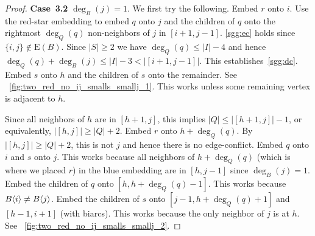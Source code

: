 \documentclass[11pt,a4paper,colorlinks=true,urlcolor=blue,citecolor=red]{article}
\theoremstyle{plain}
\newcommand{\case}[1]{\par\vspace{.5\baselineskip}\noindent\textbf{\sffamily Case~#1}}
\newcommand{\EB}{\mathrm{E}(B)}
\begin{document}
\begin{proof}
  \case{3.2} $\deg_B(j)=1$. We first try the following. Embed $r$ onto
  $i$. Use the red-star embedding to embed $q$ onto $j$ and the
  children of $q$ onto the rightmost $\deg_Q(q)$ non-neighbors of $j$ in
  $[i+1,j-1]$. \ref{sgg:ec} holds since $\{i,j\}\not\in\EB$. Since
  $|S|\geq 2$ we have $\deg_Q(q)\leq|I|-4$ and hence
  $\deg_Q(q)+\deg_B(j)\leq |I|-3<|[i+1,j-1]|$. This
  establishes~\ref{sgg:dc}. Embed $s$ onto $h$ and the children of $s$
  onto the remainder. See
  \figurename~\ref{fig:two_red_no_ij_smalls_smallj_1}. This works unless
  some remaining vertex is adjacent to $h$.

  Since all neighbors of $h$ are in $[h+1,j]$, this implies $|Q|\leq
  |[h+1,j]|-1$, or equivalently, $|[h,j]|\geq |Q|+2$. Embed $r$ onto
  $h+\deg_Q(q)$. By $|[h,j]|\geq |Q|+2$, this is not $j$ and hence there
  is no edge-conflict. Embed $q$ onto $i$ and $s$ onto $j$. This works
  because all neighbors of $h+\deg_Q(q)$ (which is where we placed $r$)
  in the blue embedding are in $[h,j-1]$ since $\deg_B(j)=1$. Embed the
  children of $q$ onto $[h,h+\deg_Q(q)-1]$. This works because
  $B\langle{i}\rangle\neq B\langle{j}\rangle$. Embed the children of $s$ onto
  $[j-1,h+\deg_Q(q)+1]$ and $[h-1,i+1]$ (with biarcs). This works
  because the only neighbor of $j$ is at $h$. See
  \figurename~\ref{fig:two_red_no_ij_smalls_smallj_2}.
\end{proof}
\end{document}
